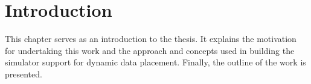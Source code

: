 \documentclass{listhesis}
\begin{document}
\maketitle
\cleardoublepage

\makeabstract
\clearpage

\tableofcontents
\clearpage
\listoffigures
\clearpage
\listoftables
\clearpage


\chapter{Introduction}
This chapter serves as an introduction to the thesis. It explains the motivation for undertaking this work and the approach and concepts used in building the simulator support for dynamic data placement. Finally, the outline of the work is presented.
\end{document}
